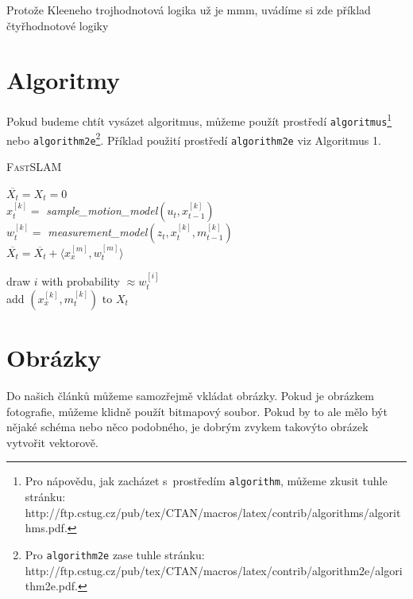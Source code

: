\documentclass[11pt,a4paper]{article}
\begin{document}
\begin{table}[h]
\begin{center}
\caption{Protože Kleeneho trojhodnotová logika už je mmm, uvádíme si zde příklad čtyřhodnotové logiky}
\label{tabulky}
\end{center}
\end{table}



\section{Algoritmy} \label{sec:sec3}
Pokud budeme chtít vysázet algoritmus, můžeme použít prostředí \texttt{algoritmus}\footnote{Pro nápovědu, jak zacházet s~prostředím \texttt{algorithm}, můžeme zkusit tuhle stránku: \\http://ftp.cstug.cz/pub/tex/CTAN/macros/latex/contrib/algorithms/algorithms.pdf.} nebo \texttt{algorithm2e}\footnote{Pro \texttt{algorithm2e} zase tuhle stránku: http://ftp.cstug.cz/pub/tex/CTAN/macros/latex/contrib/algorithm2e/algorithm2e.pdf.}.
Příklad použití prostředí \texttt{algorithm2e} viz Algoritmus 1.

\bigskip

\begin{algorithm}[h]
\caption{\textsc{Fast}SLAM}
\label{alg1}

\SetNlSty{}{}{:  } %
\SetInd{1em}{1em}
\SetNlSkip{-1.33em}

\BlankLine
\Indp 
$\overline{X_t} = X_t = 0$ \\
	{
	    $x_t^{[k]} =$ \emph{sample\_motion\_model}$(u_t,x_{t-1}^{[k]})$\\
	     $w_t^{[k]} =$ \emph{measurement\_model$(z_t, x_t^{[k]}, m_{t-1}^{[k]})$} \\
	     $\overline{X_t} = \overline{X_t} + \langle x_x^{[m]},w_t^{[m]}\rangle$
	 }
	 
	{
		draw $i$ with probability $\approx w_t^{[i]}$ \\
		add $( x_x^[k], m_t^{[k]} )$ to $X_t$
	}
	
\end{algorithm}

\section{Obrázky}
Do našich článků můžeme samozřejmě vkládat obrázky. Pokud je obrázkem fotografie,
můžeme klidně použít bitmapový soubor. Pokud by to ale mělo být nějaké schéma nebo
něco podobného, je dobrým zvykem takovýto obrázek vytvořit vektorově.
\end{document}
